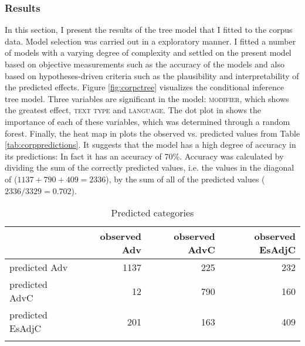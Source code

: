 \subsubsection{Results}
In this section, I present the results of the tree model that I fitted to the corpus data. Model selection was carried out in a exploratory manner. I fitted a number of models with a varying degree of complexity and settled on the present model based on objective measurements such as the accuracy of the models and also based on hypotheses-driven criteria such as the plausibility and interpretability of the predicted effects. 
Figure \ref{fig:corpctree} visualizes the conditional inference tree model. 
Three variables are significant in the model: \textsc{modifier}, which shows the greatest effect, \textsc{text type} and \textsc{language}. The dot plot in  shows the importance of each of these variables, which was determined through a random forest.  Finally, the heat map in  plots the observed vs. predicted values from Table \ref{tab:corppredictions}. It suggests that the model has a high degree of accuracy in its predictions: In fact it has an accuracy of 70\%. Accuracy was calculated by dividing the sum of the correctly predicted values, i.e. the values in the diagonal of  ($1137+790+409=2336$), by the sum of all of the predicted values ($2336/3329=0.702$).


\begin{table}
	\begin{tabular}{lrrr}
\lsptoprule
		& observed Adv & observed AdvC & observed EsAdjC \\ 
\midrule
		predicted	Adv & 1137 & 225 & 232 \\ 
		predicted	AdvC &  12 & 790 & 160 \\ 
		predicted	EsAdjC & 201 & 163 & 409 \\ 
\lspbottomrule
	\end{tabular}
	\caption{Predicted categories \label{tab:corppredictionsnew}}
\end{table}


